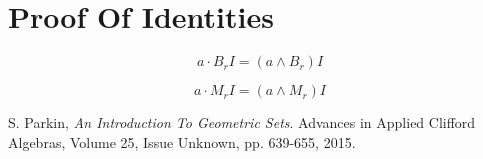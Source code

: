 \documentclass{birkjour}
\theoremstyle{definition}
\theoremstyle{remark}
\numberwithin{equation}{section}
\begin{document}
\section{Proof Of Identities}



\begin{equation}
a\cdot B_rI = (a\wedge B_r)I
\end{equation}

\begin{equation}
a\cdot M_rI = (a\wedge M_r)I
\end{equation}

\begin{thebibliography}{9}

S. Parkin,
\emph{An Introduction To Geometric Sets}.
Advances in Applied Clifford Algebras, Volume 25, Issue Unknown, pp. 639-655, 2015.

\end{thebibliography}
\end{document}
